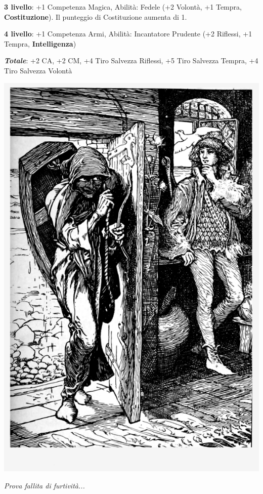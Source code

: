 \begin{multicols}{2}
\begin{changemargin}{0.3cm}{0.3cm}
\begin{tcolorbox}[title = Tups arriva al 4' livello!]
		\textbf{3 livello}: +1 Competenza Magica, Abilità: Fedele (+2 Volontà, +1 Tempra, \textbf{Costituzione}). Il punteggio di Costituzione aumenta di 1.
		
		\textbf{4 livello}: +1 Competenza Armi, Abilità: Incantatore Prudente (+2 Riflessi, +1 Tempra, \textbf{Intelligenza})
		
		\textbf{\emph{Totale}}: +2 CA, +2 CM, +4 Tiro Salvezza Riflessi, +5 Tiro Salvezza Tempra, +4 Tiro Salvezza Volontà
		
\end{tcolorbox}\end{changemargin}

\end{multicols}

\vfill


\begin{center}
\includegraphics[width=0.45\linewidth]{immagini/attaccoallespalle.png}

\textit{Prova fallita di furtività...}
\end{center}



\pagebreak

